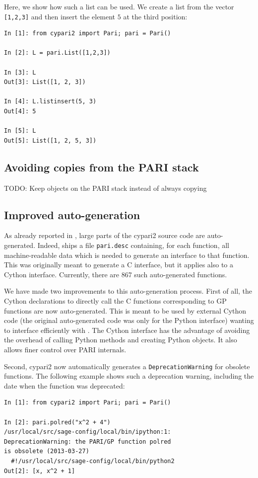 \documentclass{deliverablereport}
\begin{document}
Here, we show how such a list can be used.
We create a list from the vector \verb/[1,2,3]/ and then insert the
element $5$ at the third position:
\begin{verbatim}
In [1]: from cypari2 import Pari; pari = Pari()

In [2]: L = pari.List([1,2,3])

In [3]: L
Out[3]: List([1, 2, 3])

In [4]: L.listinsert(5, 3)
Out[4]: 5

In [5]: L
Out[5]: List([1, 2, 5, 3])
\end{verbatim}

\subsection{Avoiding copies from the PARI stack}

TODO: Keep objects on the PARI stack instead of always copying

\subsection{Improved auto-generation}

As already reported in ,
large parts of the cypari2 source code are auto-generated.
Indeed, \Pari ships a file \verb/pari.desc/ containing,
for each function, all machine-readable data which is needed to generate
an interface to that function.
This was originally meant to generate a C interface,
but it applies also to a Cython interface.
Currently, there are 867 such auto-generated functions.

We have made two improvements to this auto-generation process.
First of all,
the Cython declarations to directly call the C functions
corresponding to GP functions are now auto-generated.
This is meant to be used by external Cython code
(the original auto-generated code was only for the Python interface)
wanting to interface efficiently with \Pari.
The Cython interface has the advantage of avoiding the
overhead of calling Python methods and creating Python objects.
It also allows finer control over PARI internals.


Second, cypari2 now automatically
generates a \texttt{DeprecationWarning}
for obsolete \PariGP functions.
The following example shows such a deprecation warning,
including the date when the function was deprecated:
\begin{verbatim}
In [1]: from cypari2 import Pari; pari = Pari()

In [2]: pari.polred("x^2 + 4")
/usr/local/src/sage-config/local/bin/ipython:1:
DeprecationWarning: the PARI/GP function polred
is obsolete (2013-03-27)
  #!/usr/local/src/sage-config/local/bin/python2
Out[2]: [x, x^2 + 1]
\end{verbatim}
\end{document}
